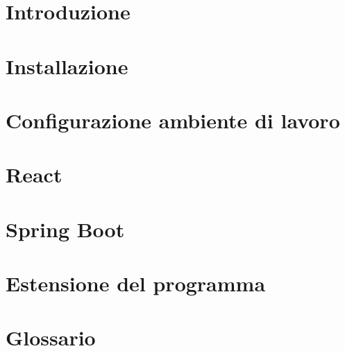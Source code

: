\documentclass[a4paper, oneside, openany, dvipsnames, table]{article}
\begin{document}
\copertina{}
\newpage

\newpage
\tableofcontents
\newpage
\listoffigures
\newpage
\listoftables

\newpage
\newpage
\section{Introduzione}
	

\newpage
\section{Installazione}


\newpage
\section{Configurazione ambiente di lavoro}


\newpage
\section{React}


\newpage
\section{Spring Boot}


\newpage
\section{Estensione del programma}


\appendix
{}

\newpage
\section{Glossario}

\end{document}

